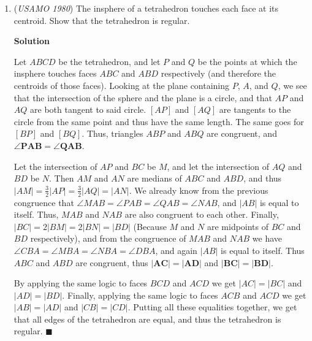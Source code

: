 \begin{enumerate}
 Finally, note that $\frac{1}{2}\left((a+b+c)^2-(a^2+b^2+c^2)\right)=ab+bc+ac$ is real as well.

 It suffices to show that $P_n=a^n+b^n+c^n$ is real for all positive integer $n$, which can be shown by induction.

 Newton Sums gives the following relationship between sums of the form $P_k=a^k+b^k+c^k$
 \[P_k-S_1P_{k-1}+S_2P_{k-2}-S_3P_{k-3}=0\]Where $S_1=a+b+c$, $S_2=ab+bc+ac$, and $S_3=abc$. It is given that $P_0, P_1, P_2$ are real. Note that if  $P_{k-1}, P_{k-2}, P_{k-3}$ are real, then clearly $P_k$ is real because all other parts of the above equation are real, completing the induction.

 


	\item (\textit{USAMO 1980}) The insphere of a tetrahedron touches each face at its centroid. Show that the tetrahedron is regular.


 



\textbf{Solution}

Let $ABCD$ be the tetrahedron, and let $P$ and $Q$ be the points at which the insphere touches faces $ABC$ and $ABD$ respectively (and therefore the centroids of those faces). Looking at the plane containing $P$, $A$, and $Q$, we see that the intersection of the sphere and the plane is a circle, and that $AP$ and $AQ$ are both tangent to said circle. $[AP]$ and $[AQ]$ are tangents to the circle from the same point and thus have the same length. The same goes for $[BP]$ and $[BQ]$. Thus, triangles $ABP$ and $ABQ$ are congruent, and $\mathbf{\angle PAB = \angle QAB}$.

 Let the intersection of $AP$ and $BC$ be $M$, and let the intersection of $AQ$ and $BD$ be $N$. Then $AM$ and $AN$ are medians of $ABC$ and $ABD$, and thus $|AM| = \frac{3}{2}|AP| = \frac{3}{2}|AQ| = |AN|$. We already know from the previous congruence that $\angle{MAB} = \angle{PAB} = \angle{QAB} = \angle{NAB}$, and $|AB|$ is equal to itself. Thus, $MAB$ and $NAB$ are also congruent to each other. Finally, $|BC| = 2|BM| = 2|BN| = |BD|$ (Because $M$ and $N$ are midpoints of $BC$ and $BD$ respectively), and from the congruence of $MAB$ and $NAB$ we have $\angle{CBA} = \angle{MBA} = \angle{NBA} = \angle{DBA}$, and again $|AB|$ is equal to itself. Thus $ABC$ and $ABD$ are congruent, thus $\mathbf{|AC| = |AD|}$ and $\mathbf{|BC| = |BD|}$.

 By applying the same logic to faces $BCD$ and $ACD$ we get $|AC| = |BC|$ and $|AD| = |BD|$. Finally, applying the same logic to faces $ACB$ and $ACD$ we get $|AB| = |AD|$ and $|CB| = |CD|$. Putting all these equalities together, we get that all edges of the tetrahedron are equal, and thus the tetrahedron is regular. $\blacksquare$




\end{enumerate}
